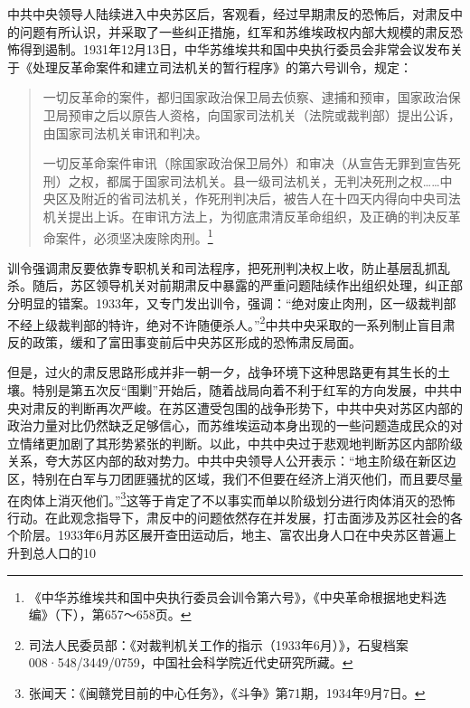 中共中央领导人陆续进入中央苏区后，客观看，经过早期肃反的恐怖后，对肃反中的问题有所认识，并采取了一些纠正措施，红军和苏维埃政权内部大规模的肃反恐怖得到遏制。1931年12月13日，中华苏维埃共和国中央执行委员会非常会议发布关于《处理反革命案件和建立司法机关的暂行程序》的第六号训令，规定：

\begin{quote}

一切反革命的案件，都归国家政治保卫局去侦察、逮捕和预审，国家政治保卫局预审之后以原告人资格，向国家司法机关（法院或裁判部）提出公诉，由国家司法机关审讯和判决。

一切反革命案件审讯（除国家政治保卫局外）和审决（从宣告无罪到宣告死刑）之权，都属于国家司法机关。县一级司法机关，无判决死刑之权……中央区及附近的省司法机关，作死刑判决后，被告人在十四天内得向中央司法机关提出上诉。在审讯方法上，为彻底肃清反革命组织，及正确的判决反革命案件，必须坚决废除肉刑。\footnote{《中华苏维埃共和国中央执行委员会训令第六号》，《中央革命根据地史料选编》（下），第657～658页。}
\end{quote}


训令强调肃反要依靠专职机关和司法程序，把死刑判决权上收，防止基层乱抓乱杀。随后，苏区领导机关对前期肃反中暴露的严重问题陆续作出组织处理，纠正部分明显的错案。1933年，又专门发出训令，强调：“绝对废止肉刑，区一级裁判部不经上级裁判部的特许，绝对不许随便杀人。”\footnote{司法人民委员部：《对裁判机关工作的指示（1933年6月）》，石叟档案008·548/3449/0759，中国社会科学院近代史研究所藏。}中共中央采取的一系列制止盲目肃反的政策，缓和了富田事变前后中央苏区形成的恐怖肃反局面。


但是，过火的肃反思路形成并非一朝一夕，战争环境下这种思路更有其生长的土壤。特别是第五次反“围剿”开始后，随着战局向着不利于红军的方向发展，中共中央对肃反的判断再次严峻。在苏区遭受包围的战争形势下，中共中央对苏区内部的政治力量对比仍然缺乏足够信心，而苏维埃运动本身出现的一些问题造成民众的对立情绪更加剧了其形势紧张的判断。以此，中共中央过于悲观地判断苏区内部阶级关系，夸大苏区内部的敌对势力。中共中央领导人公开表示：“地主阶级在新区边区，特别在白军与刀团匪骚扰的区域，我们不但要在经济上消灭他们，而且要尽量在肉体上消灭他们。”\footnote{张闻天：《闽赣党目前的中心任务》，《斗争》第71期，1934年9月7日。}这等于肯定了不以事实而单以阶级划分进行肉体消灭的恐怖行动。在此观念指导下，肃反中的问题依然存在并发展，打击面涉及苏区社会的各个阶层。1933年6月苏区展开查田运动后，地主、富农出身人口在中央苏区普遍上升到总人口的10%


